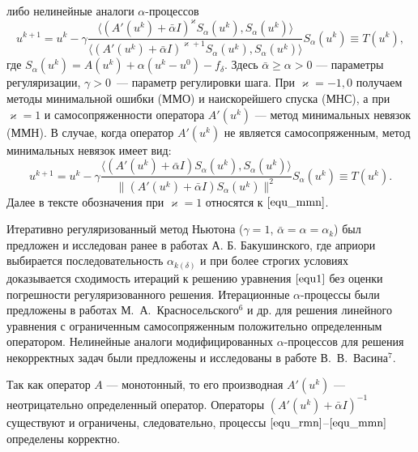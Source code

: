 \documentclass[%
autoref,     %
href,        %
colorlinks,  %
]{disser}
\begin{document}
либо нелинейные аналоги $\alpha$-процессов
\begin{equation}\label{equ_alphaproc}
u^{k+1}=u^k-\gamma\frac{\langle (A'(u^k)+\bar\alpha I)^{\varkappa}S_\alpha(u^k), S_\alpha(u^k)\rangle }{\langle(A'(u^k)+\bar\alpha I)^{\varkappa+1}S_\alpha(u^k), S_\alpha(u^k)\rangle }S_\alpha(u^k)\equiv{T(u^k)},
\end{equation}
где $S_\alpha(u^k)=A(u^k)+\alpha(u^k-u^0)-f_\delta$. Здесь $\bar\alpha \ge \alpha >0$ --- параметры регуляризации, $\gamma>0$~--- параметр регулировки шага. При $\varkappa=-1,0$ получаем методы минимальной ошибки (ММО) и наискорейшего спуска (МНС), а при $\varkappa=1$ и самосопряженности оператора $A'(u^k)$ --- метод минимальных невязок (ММН). В случае, когда оператор $A'(u^k)$ не является самосопряженным, метод минимальных невязок имеет вид:
\begin{equation}\label{equ_mmn}
u^{k+1} =u^k - \gamma\frac{\langle (A'(u^k)+\bar{\alpha}I)S_\alpha(u^k), S_\alpha (u^k)\rangle}{\|(A'(u^k)+\bar{\alpha}I)S_\alpha(u^k)\|^2}S_\alpha (u^k)\equiv{T(u^k)}.
\end{equation}
Далее в тексте обозначения при $\varkappa=1$ относятся к $\eqref{equ_mmn}$.

Итеративно регуляризованный метод Ньютона ($\gamma=1$, $ \bar\alpha=\alpha={\alpha}_k$) был предложен и исследован ранее в работах А. Б. Бакушинского, где априори выбирается последовательность ${\alpha}_{k(\delta)}$ и при более строгих условиях доказывается сходимость итераций к решению уравнения $\eqref{equ1}$ без оценки погрешности регуляризованного решения. Итерационные $\alpha$-процессы были предложены в работах М.~А.~Красносельского$^6$ и др. для решения линейного уравнения с ограниченным самосопряженным положительно определенным оператором. Нелинейные аналоги модифицированных $\alpha$-процессов для решения некорректных задач были предложены и исследованы в работе В.~В.~Васина$^7$.

{\scriptsize
	\let\thefootnote\relax\let\thefootnote\relax{}
	\let\thefootnote\relax\let\thefootnote\relax{}
}

Так как оператор $A$ --- монотонный, то его производная $A'(u^k)$ --- неотрицательно определенный оператор. Операторы $(A'(u^k)+\bar\alpha I)^{-1}$ существуют и ограничены, следовательно, процессы $\eqref{equ_rmn}$--$\eqref{equ_mmn}$ определены корректно. 
\end{document}
